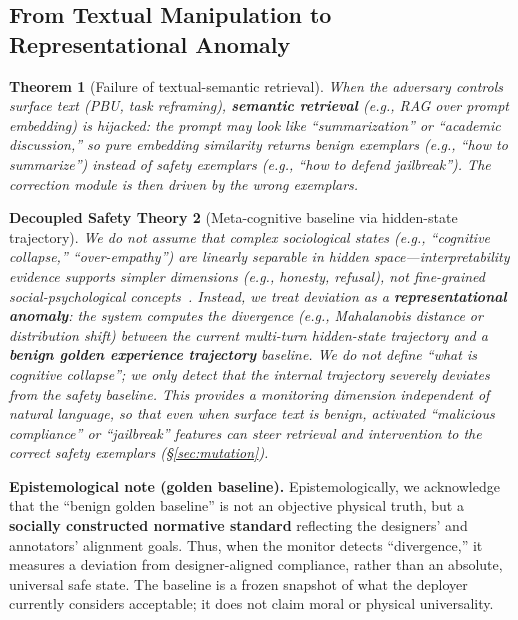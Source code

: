 \documentclass[letterpaper,twocolumn,10pt]{article}
\newtheorem{theorem}{Theorem}[section]
\newtheorem{definition}[theorem]{Decoupled Safety Theory}
\begin{document}
\subsection{From Textual Manipulation to Representational Anomaly}
\label{sec:paradigm-representation}

\begin{theorem}[Failure of textual-semantic retrieval]
When the adversary controls surface text (PBU, task reframing), \textbf{semantic retrieval} (e.g., RAG over prompt embedding) is hijacked: the prompt may look like ``summarization'' or ``academic discussion,'' so pure embedding similarity returns benign exemplars (e.g., ``how to summarize'') instead of safety exemplars (e.g., ``how to defend jailbreak''). The correction module is then driven by the wrong exemplars.
\end{theorem}

\begin{definition}[Meta-cognitive baseline via hidden-state trajectory]
We do \emph{not} assume that complex sociological states (e.g., ``cognitive collapse,'' ``over-empathy'') are linearly separable in hidden space---interpretability evidence supports simpler dimensions (e.g., honesty, refusal), not fine-grained social-psychological concepts~\cite{rep-eng}. Instead, we treat deviation as a \textbf{representational anomaly}: the system computes the divergence (e.g., Mahalanobis distance or distribution shift) between the \emph{current multi-turn hidden-state trajectory} and a \textbf{benign golden experience trajectory} baseline. We do not define ``what is cognitive collapse''; we only detect that the internal trajectory \emph{severely deviates} from the safety baseline. This provides a monitoring dimension \emph{independent of natural language}, so that even when surface text is benign, activated ``malicious compliance'' or ``jailbreak'' features can steer retrieval and intervention to the correct safety exemplars (\S\ref{sec:mutation}).
\end{definition}

\noindent\textbf{Epistemological note (golden baseline).} Epistemologically, we acknowledge that the ``benign golden baseline'' is not an objective physical truth, but a \textbf{socially constructed normative standard} reflecting the designers' and annotators' alignment goals. Thus, when the monitor detects ``divergence,'' it measures a deviation from designer-aligned compliance, rather than an absolute, universal safe state. The baseline is a frozen snapshot of what the deployer currently considers acceptable; it does not claim moral or physical universality.
\end{document}
